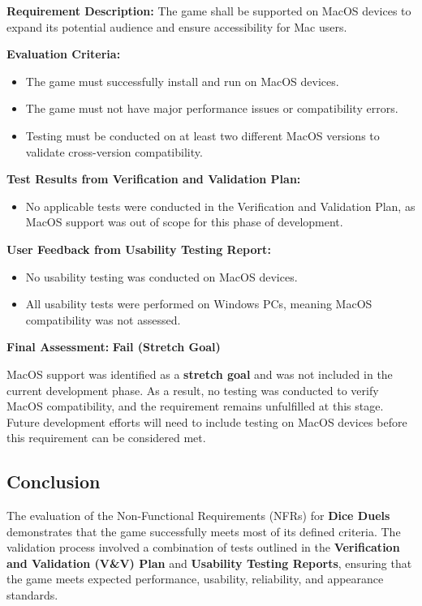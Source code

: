 \documentclass[12pt, titlepage]{article}
\begin{document}
\textbf{Requirement Description:}  
The game shall be supported on MacOS devices to expand its potential audience and ensure accessibility for Mac users.

\textbf{Evaluation Criteria:}  
\begin{itemize}
    \item The game must successfully install and run on MacOS devices.
    \item The game must not have major performance issues or compatibility errors.
    \item Testing must be conducted on at least two different MacOS versions to validate cross-version compatibility.
\end{itemize}

\textbf{Test Results from Verification and Validation Plan:}  
\begin{itemize}
    \item No applicable tests were conducted in the Verification and Validation Plan, as MacOS support was out of scope for this phase of development.
\end{itemize}

\textbf{User Feedback from Usability Testing Report:}  
\begin{itemize}
    \item No usability testing was conducted on MacOS devices.
    \item All usability tests were performed on Windows PCs, meaning MacOS compatibility was not assessed.
\end{itemize}

\textbf{Final Assessment:} \textbf{Fail (Stretch Goal)}  

MacOS support was identified as a \textbf{stretch goal} and was not included in the current development phase. As a result, no testing was conducted to verify MacOS compatibility, and the requirement remains unfulfilled at this stage. Future development efforts will need to include testing on MacOS devices before this requirement can be considered met.


\subsection{Conclusion}

The evaluation of the Non-Functional Requirements (NFRs) for \textbf{Dice Duels} demonstrates that the game successfully meets most of its defined criteria. The validation process involved a combination of tests outlined in the \textbf{Verification and Validation (V\&V) Plan} and \textbf{Usability Testing Reports}, ensuring that the game meets expected performance, usability, reliability, and appearance standards.
\end{document}
